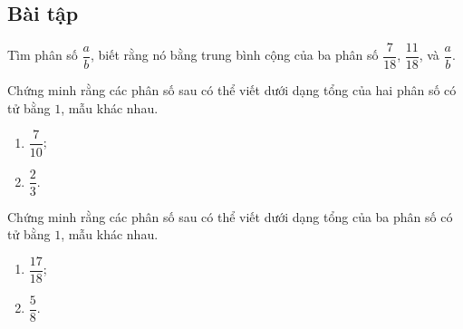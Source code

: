 \subsection{Bài tập}
\begin{bt}
	Tìm phân số $\dfrac{a}{b}$, biết rằng nó bằng trung bình cộng của ba phân số $\dfrac{7}{18}$, $\dfrac{11}{18}$, và $\dfrac{a}{b}$.
\end{bt}
\begin{bt}
	Chứng minh rằng các phân số sau có thể viết dưới dạng tổng của hai phân số có tử bằng $1$, mẫu khác nhau.
	\begin{multicols}{2}
		\begin{enumerate}
			\item $\dfrac{7}{10}$;
			\item $\dfrac{2}{3}$.
		\end{enumerate}
	\end{multicols}
\end{bt}
\begin{bt}
	Chứng minh rằng các phân số sau có thể viết dưới dạng tổng của ba phân số có tử bằng $1$, mẫu khác nhau.
	\begin{multicols}{2}
		\begin{enumerate}
			\item $\dfrac{17}{18}$;
			\item $\dfrac{5}{8}$.
		\end{enumerate}
	\end{multicols}
\end{bt}
